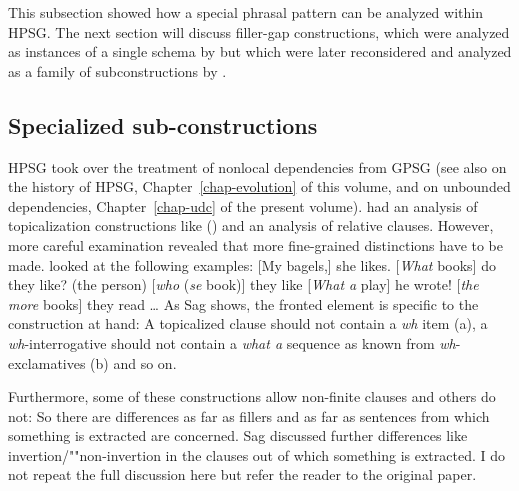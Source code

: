 \documentclass[output=paper]{langsci/langscibook}
\begin{document}

This subsection showed how a special phrasal pattern can be analyzed within HPSG. The next section
will discuss filler-gap constructions, which were analyzed as instances of a single schema by
\citet{ps2} but which were later reconsidered and analyzed as a family of subconstructions by .

\subsection{Specialized sub-constructions}

HPSG took over the treatment of nonlocal dependencies from GPSG \citep{Gazdar81} (see also
 on the history of HPSG, Chapter~\ref{chap-evolution} of this volume, and  on
unbounded dependencies, Chapter~\ref{chap-udc} of the present volume). \citet[Chapters~4 and~5]{ps2} had
an analysis of topicalization constructions like () and an analysis of relative
clauses. However, more careful examination revealed that more fine-grained distinctions have to be
made. \citet[]{Sag2010b} looked at the following examples:
\settowidth{}
\eal
\ex {}[My bagels,] she likes.                           
\ex {}[\emph{What} books] do they like?                  
\ex (the person) [\emph{who} (\emph{se} book)] they like  
\ex {}[\emph{What a} play] he wrote!                     
\ex {}[\emph{the more} books] they read \ldots          {}
\zl
As Sag shows, the fronted element is specific to the construction at hand:
\eal
{}
\zl
A topicalized clause should not contain a \emph{wh} item (a), a \emph{wh}-interrogative should not
contain a \emph{what a} sequence as known from \emph{wh}-exclamatives (b) and so on.

Furthermore, some of these constructions allow non-finite clauses and others do not:
\eal
{}
\zl
So there are differences as far as fillers and as far as sentences from which something is extracted
are concerned. Sag discussed further differences like invertion/""non-invertion in the clauses out of
which something is extracted. I do not repeat the full discussion here but refer the reader to the
original paper.
\end{document}
